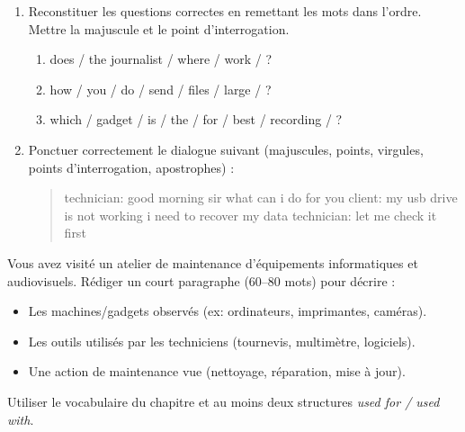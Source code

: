 \documentclass[11pt]{article}
\begin{document}
\begin{exercice}
\begin{enumerate}
\item Reconstituer les questions correctes en remettant les mots dans l'ordre. Mettre la majuscule et le point d'interrogation.
\begin{enumerate}
\item does / the journalist / where / work / ?
\item how / you / do / send / files / large / ?
\item which / gadget / is / the / for / best / recording / ?
\end{enumerate}
\item Ponctuer correctement le dialogue suivant (majuscules, points, virgules, points d'interrogation, apostrophes) :
\begin{quote}
technician: good morning sir what can i do for you
client: my usb drive is not working i need to recover my data
technician: let me check it first
\end{quote}
\end{enumerate}
\end{exercice}

\begin{exercice}
Vous avez visité un atelier de maintenance d'équipements informatiques et audiovisuels. Rédiger un court paragraphe (60--80 mots) pour décrire :
\begin{itemize}
\item Les machines/gadgets observés (ex: ordinateurs, imprimantes, caméras).
\item Les outils utilisés par les techniciens (tournevis, multimètre, logiciels).
\item Une action de maintenance vue (nettoyage, réparation, mise à jour).
\end{itemize}
Utiliser le vocabulaire du chapitre et au moins deux structures \textit{used for / used with}.
\end{exercice}
\end{document}
